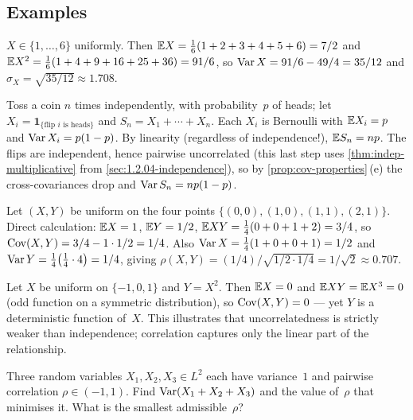 \subsection*{Examples}

\begin{example}
\label{ex:die-moments}
$X \in \{1, \dots, 6\}$ uniformly. Then
$\mathbb{E} X = \tfrac{1}{6}(1 + 2 + 3 + 4 + 5 + 6) = 7/2$ and
$\mathbb{E} X^2 = \tfrac{1}{6}(1 + 4 + 9 + 16 + 25 + 36) = 91/6$, so
$\operatorname{Var} X = 91/6 - 49/4 = 35/12$ and $\sigma_X = \sqrt{35/12} \approx 1.708$.
\end{example}

\begin{example}
\label{ex:binomial-moments}
Toss a coin $n$ times independently, with probability~$p$ of heads;
let $X_i = \mathbf{1}_{\{\text{flip } i \text{ is heads}\}}$ and
$S_n = X_1 + \cdots + X_n$. Each $X_i$ is Bernoulli with
$\mathbb{E} X_i = p$ and $\operatorname{Var} X_i = p(1 - p)$. By linearity (regardless of
independence!), $\mathbb{E} S_n = np$. The flips are independent, hence
pairwise uncorrelated (this last step uses
\cref{thm:indep-multiplicative} from
\cref{sec:1.2.04-independence}), so by
\cref{prop:cov-properties}\,(e) the cross-covariances drop and
$\operatorname{Var} S_n = n p (1 - p)$.
\end{example}

\begin{example}
\label{ex:cov-pair}
Let $(X, Y)$ be uniform on the four points
$\{(0, 0), (1, 0), (1, 1), (2, 1)\}$. Direct calculation:
$\mathbb{E} X = 1$, $\mathbb{E} Y = 1/2$,
$\mathbb{E} XY = \tfrac{1}{4}(0 + 0 + 1 + 2) = 3/4$,
so $\operatorname{Cov}(X, Y) = 3/4 - 1 \cdot 1/2 = 1/4$. Also
$\operatorname{Var} X = \tfrac{1}{4}(1 + 0 + 0 + 1) = 1/2$ and
$\operatorname{Var} Y = \tfrac{1}{4}\bigl(\tfrac{1}{4} \cdot 4\bigr) = 1/4$,
giving $\rho(X, Y) = (1/4) / \sqrt{1/2 \cdot 1/4} = 1/\sqrt{2} \approx 0.707$.
\end{example}

\begin{example}[Uncorrelated but dependent: $Y = X^2$]
\label{ex:uncorrelated-dependent}
Let $X$ be uniform on $\{-1, 0, 1\}$ and $Y = X^2$. Then $\mathbb{E} X = 0$
and $\mathbb{E} XY = \mathbb{E} X^3 = 0$ (odd function on a symmetric distribution),
so $\operatorname{Cov}(X, Y) = 0$ — yet $Y$ is a deterministic function of~$X$. This
illustrates that uncorrelatedness is strictly weaker than
independence; correlation captures only the linear part of the
relationship.
\end{example}

\begin{problem}
\label{prob:variance-of-sum-correlated}
Three random variables $X_1, X_2, X_3 \in L^2$ each have variance~$1$
and pairwise correlation $\rho \in (-1, 1)$. Find $\operatorname{Var}(X_1 + X_2 + X_3)$
and the value of~$\rho$ that minimises it. What is the smallest
admissible~$\rho$?
\end{problem}

